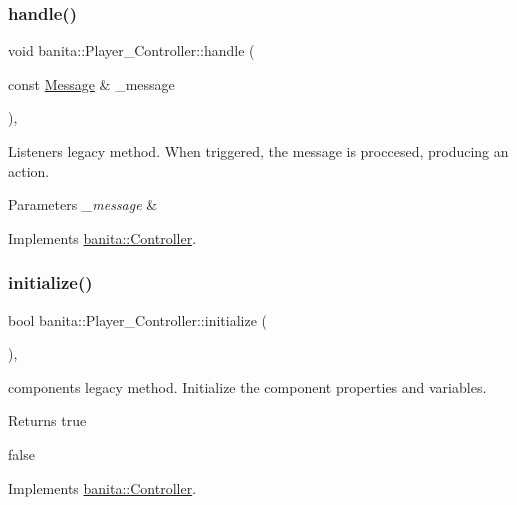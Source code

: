 \subsubsection{\texorpdfstring{handle()}{handle()}}
{\footnotesize\ttfamily void banita\+::\+Player\+\_\+\+Controller\+::handle (\begin{DoxyParamCaption}\item[{const \mbox{\hyperlink{classbanita_1_1_message}{Message}} \&}]{\+\_\+message }\end{DoxyParamCaption})\hspace{0.3cm}{\ttfamily [override]}, {\ttfamily [virtual]}}



Listener\textquotesingle{}s legacy method. When triggered, the message is proccesed, producing an action. 


\begin{DoxyParams}{Parameters}
{\em \+\_\+message} & \\
\hline
\end{DoxyParams}


Implements \mbox{\hyperlink{classbanita_1_1_controller_a2feb550d530941ed11312fbbb7730c80}{banita\+::\+Controller}}.

\mbox{\label{classbanita_1_1_player___controller_a42c2960117c977daf72083452fb69e86}} 
\subsubsection{\texorpdfstring{initialize()}{initialize()}}
{\footnotesize\ttfamily bool banita\+::\+Player\+\_\+\+Controller\+::initialize (\begin{DoxyParamCaption}{ }\end{DoxyParamCaption})\hspace{0.3cm}{\ttfamily [override]}, {\ttfamily [virtual]}}



component\textquotesingle{}s legacy method. Initialize the component properties and variables. 

\begin{DoxyReturn}{Returns}
true 

false 
\end{DoxyReturn}


Implements \mbox{\hyperlink{classbanita_1_1_controller_a3a3bc92a032f22f0cd20cbff0f89d175}{banita\+::\+Controller}}.

